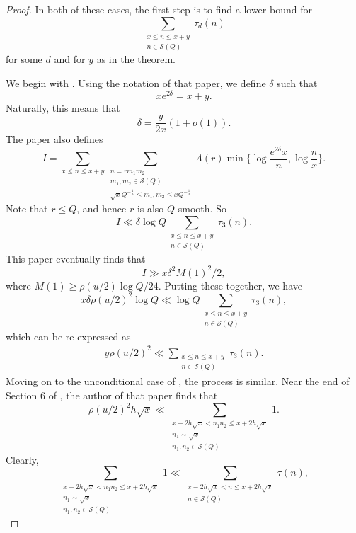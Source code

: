 \documentclass{amsart}
\newtheorem{theorem}{Theorem}[section]
\begin{document}

\begin{proof}
In both of these cases, the first step is to find a lower bound for $$\sum_{\substack{x\leq n\leq x+y \\ n\in \mathcal S(Q) }}\tau_d(n)$$
for some $d$ and for $y$ as in the theorem.

We begin with \cite{So}.  Using the notation of that paper, we define $\delta$ such that
$$xe^{2\delta}=x+y.$$
Naturally, this means that $$\delta=\frac{y}{2x}(1+o(1)).$$
The paper also defines
$$I=\sum_{x\leq n\leq x+y}\sum_{\substack{n=rm_1m_2 \\ m_1,m_2\in \mathcal S(Q) \\ \sqrt xQ^{-\frac 13}\leq m_1,m_2\leq xQ^{-\frac 14} }}\Lambda(r)\min\{\log \frac{e^{2\delta}x}{n},\log \frac nx\}.$$
Note that $r\leq Q$, and hence $r$ is also $Q$-smooth.  So
$$I\ll \delta\log Q\sum_{\substack{x\leq n\leq x+y \\ n\in \mathcal S(Q) }}\tau_3(n).$$
This paper eventually finds that 
$$I\gg x\delta^2M(1)^2/2,$$
where $M(1)\geq \rho(u/2)\log Q/24$.
Putting these together, we have
$$x\delta\rho(u/2)^2\log Q\ll \log Q\sum_{\substack{x\leq n\leq x+y \\ n\in \mathcal S(Q) }}\tau_3(n),$$
which can be re-expressed as
\begin{gather}\label{zrho}y\rho(u/2)^2\ll \sum_{\substack{x\leq n\leq x+y \\ n\in \mathcal S(Q) }}\tau_3(n).
\end{gather}
Moving on to the unconditional case of \cite{Go}, the process is similar.  Near the end of Section 6 of \cite{Go}, the author of that paper finds that 
$$\rho(u/2)^2h\sqrt x\ll \sum_{\substack{x-2h\sqrt x<n_1n_2\leq x+2h\sqrt x \\ n_1\sim \sqrt x \\ n_1,n_2\in \mathcal S(Q)}}1.$$
Clearly,
$$\sum_{\substack{x-2h\sqrt x<n_1n_2\leq x+2h\sqrt x \\ n_1\sim \sqrt x \\ n_1,n_2\in \mathcal S(Q)}}1\ll \sum_{\substack{x-2h\sqrt x<n\leq x+2h\sqrt x \\ n\in \mathcal S(Q)}}\tau(n),$$

\end{proof}
\end{document}
